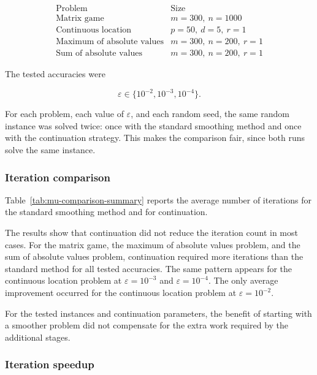 \documentclass[11pt]{article}
\begin{document}
\[
\begin{array}{l|c}
\text{Problem} & \text{Size}\\
\hline
\text{Matrix game} & m=300,\ n=1000\\
\text{Continuous location} & p=50,\ d=5,\ r=1\\
\text{Maximum of absolute values} & m=300,\ n=200,\ r=1\\
\text{Sum of absolute values} & m=300,\ n=200,\ r=1
\end{array}
\]

The tested accuracies were

\[
    \varepsilon\in\{10^{-2},10^{-3},10^{-4}\}.
\]

For each problem, each value of \(\varepsilon\), and each random seed, the same
random instance was solved twice: once with the standard smoothing method and
once with the continuation strategy. This makes the comparison fair, since both
runs solve the same instance.

\subsubsection{Iteration comparison}

Table~\ref{tab:mu-comparison-summary} reports the average number of iterations
for the standard smoothing method and for continuation.

\begin{table}[H]
    \centering
    
    \caption{Comparison of the standard smoothing method and continuation.}
    \label{tab:mu-comparison-summary}
\end{table}

The results show that continuation did not reduce the iteration count in most
cases. For the matrix game, the maximum of absolute values problem, and the sum
of absolute values problem, continuation required more iterations than the
standard method for all tested accuracies. The same pattern appears for the
continuous location problem at \(\varepsilon=10^{-3}\) and
\(\varepsilon=10^{-4}\). The only average improvement occurred for the
continuous location problem at \(\varepsilon=10^{-2}\).

For the tested instances and continuation parameters, the benefit of starting
with a smoother problem did not compensate for the extra work required by the
additional stages.

\subsubsection{Iteration speedup}
\end{document}
